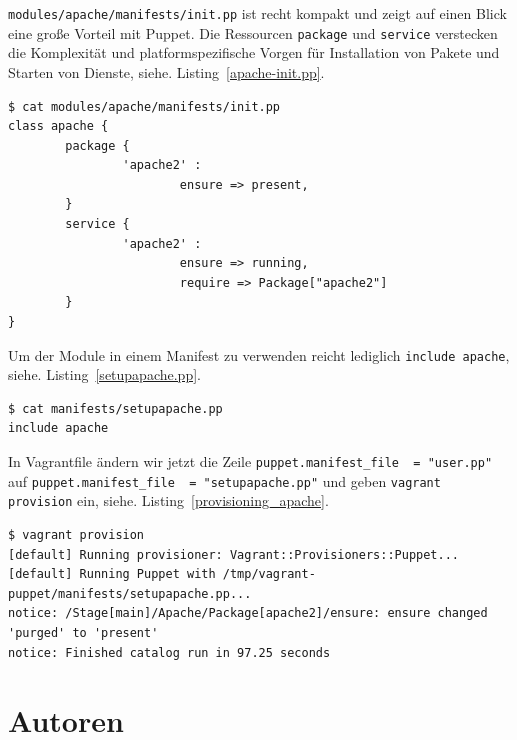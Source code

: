 \documentclass[12pt,a4paper,ngerman]{article}
\newcommand{\reflst}[1]{, siehe. Listing~\ref{#1}}
\begin{document}
\lstinline$modules/apache/manifests/init.pp$ ist recht kompakt und zeigt auf einen Blick eine große Vorteil mit Puppet. Die Ressourcen \lstinline$package$ und \lstinline$service$ verstecken die Komplexität und platformspezifische Vorgen für Installation von Pakete und Starten von Dienste\reflst{apache-init.pp}.
\begin{lstlisting}[caption=modules/apache/manifests/init.pp, label=apache-init.pp]
$ cat modules/apache/manifests/init.pp 
class apache {
        package {
                'apache2' :
                        ensure => present,
        }
        service {
                'apache2' :
                        ensure => running,
                        require => Package["apache2"]
        }
}
\end{lstlisting}

Um der Module in einem Manifest zu verwenden reicht lediglich \lstinline$include apache$\reflst{setupapache.pp}.
\begin{lstlisting}[caption=manifests/setupapache.pp, label=setupapache.pp]
$ cat manifests/setupapache.pp 
include apache
\end{lstlisting}

In Vagrantfile ändern wir jetzt die Zeile \lstinline$puppet.manifest_file  = "user.pp"$ auf \lstinline$puppet.manifest_file  = "setupapache.pp"$ und geben \lstinline$vagrant provision$ ein\reflst{provisioning_apache}.

\begin{lstlisting}[caption=vagrant provisioning für Apache, label=provisioning_apache]
$ vagrant provision
[default] Running provisioner: Vagrant::Provisioners::Puppet...
[default] Running Puppet with /tmp/vagrant-puppet/manifests/setupapache.pp...
notice: /Stage[main]/Apache/Package[apache2]/ensure: ensure changed 'purged' to 'present'
notice: Finished catalog run in 97.25 seconds
\end{lstlisting}

\section*{Autoren}
\end{document}
